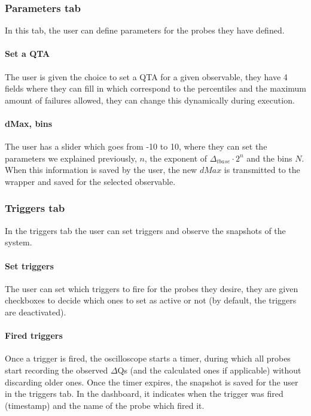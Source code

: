     \subsubsection{Parameters tab}
        In this tab, the user can define parameters for the probes they have defined.

    \paragraph{Set a QTA}
        The user is given the choice to set a QTA for a given observable, they have 4 fields where they can fill in which correspond to the percentiles and the maximum amount of failures allowed, they can change this dynamically during execution.

    \paragraph{dMax, bins}
        The user has a slider which goes from -10 to 10, where they can set the parameters we explained previously, $n$, the exponent of $\Delta_{tbase} \cdot 2^n$ and the bins $N$. When this information is saved by the user, the new $dMax$ is transmitted to the wrapper and saved for the selected observable.

    \subsubsection{Triggers tab}
        In the triggers tab the user can set triggers and observe the snapshots of the system.

    \paragraph{Set triggers}
        The user can set which triggers to fire for the probes they desire, they are given checkboxes to decide which ones to set as active or not (by default, the triggers are deactivated).
    
    \paragraph{Fired triggers}
        Once a trigger is fired, the oscilloscope starts a timer, during which all probes start recording the observed $\Delta$Qs (and the calculated ones if applicable) without discarding older ones. Once the timer expires, the snapshot is saved for the user in the triggers tab. In the dashboard, it indicates when the trigger was fired (timestamp) and the name of the probe which fired it.
